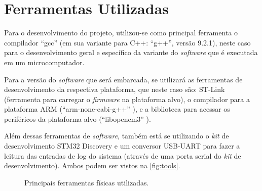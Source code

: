 %
%
%
%
%

%
%
%
%
%

\section{Ferramentas Utilizadas} \label{sec:tools}

Para o desenvolvimento do projeto, utilizou-se como principal ferramenta o compilador ``gcc'' \cite{gcc} (em sua variante para C++: ``g++'', versão 9.2.1), neste caso para o desenvolvimento geral e específico da variante do \textit{software} que é executada em um microcomputador.

Para a versão do \textit{software} que será embarcada, se utilizará as ferramentas de desenvolvimento da respectiva plataforma, que neste caso são: ST-Link \cite{stlink} (ferramenta para carregar o \textit{firmware} na plataforma alvo), o compilador para a plataforma ARM (``arm-none-eabi-g++'' \cite{gcc_arm}), e a biblioteca para acessar os periféricos da plataforma alvo (``libopencm3'' \cite{libopencm3}).

Além dessas ferramentas de \textit{software}, também está se utilizando o \textit{kit} de desenvolvimento STM32 Discovery \cite{stm32_discovery} e um conversor USB-UART para fazer a leitura das entradas de log do sistema (através de uma porta serial do \textit{kit} de desenvolvimento). Ambos podem ser vistos na \autoref{fig:tools}.

\begin{figure}[!ht]
    \begin{center}
        \qquad
        \caption{Principais ferramentas físicas utilizadas.}
        \label{fig:tools}
    \end{center}
\end{figure}
